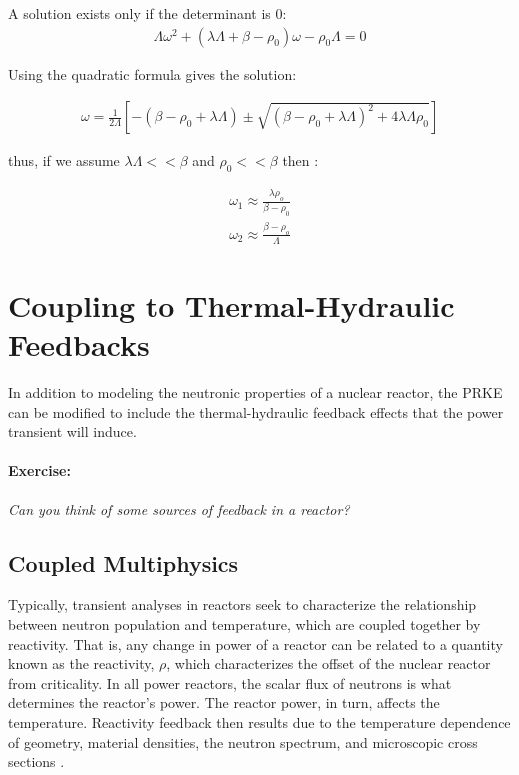 \documentclass[12pt]{article}
\begin{document}
A solution exists only if the determinant is 0:
\begin{align}
\Lambda\omega^2 + \left(\lambda\Lambda + \beta - \rho_0\right)\omega - \rho_0\Lambda = 0
\end{align}

Using the quadratic formula gives the solution:

\begin{align}
\omega = \frac{1}{2 \Lambda}\left[ -\left( \beta - \rho_0 +\lambda\Lambda 
\right) \pm \sqrt{(\beta-\rho_0+\lambda\Lambda)^2 +4\lambda\Lambda\rho_0} \right]
\end{align}

thus, if we assume $\lambda\Lambda << \beta$ and $\rho_0 << \beta$ then :

\begin{align}
\omega_1 \approx \frac{\lambda \rho_o}{\beta-\rho_0}\\
\omega_2 \approx \frac{\beta - \rho_o}{\Lambda}
\end{align}

\section{Coupling to Thermal-Hydraulic Feedbacks}

In addition to modeling
the neutronic properties of a nuclear reactor, the PRKE can be modified to
include the thermal-hydraulic feedback effects that the power transient will
induce.

\paragraph{Exercise:} \emph{Can you think of some sources of feedback in a 
reactor?}

\subsection{Coupled Multiphysics}

Typically, transient analyses in reactors seek to characterize the relationship
between neutron population and temperature, which are coupled together by
reactivity.  That is, any change in power of a reactor can be related to a
quantity known as the reactivity, $\rho$, which characterizes the offset of the
nuclear reactor from criticality. In all power reactors,  the scalar flux of
neutrons is what determines the reactor's power. The reactor power, in turn,
affects the temperature. Reactivity feedback then results due to the temperature
dependence of geometry, material densities, the neutron spectrum, and
microscopic cross sections \cite{bell_nuclear_1970}.
\end{document}
